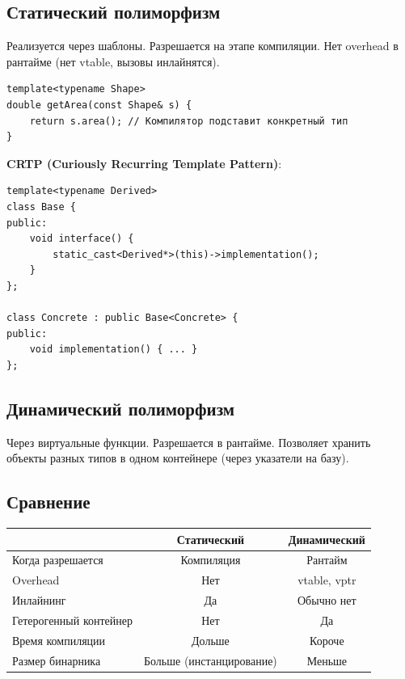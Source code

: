 \documentclass[12pt,a4paper]{article}
\begin{document}
\subsection{Статический полиморфизм}

Реализуется через шаблоны. Разрешается на этапе компиляции. Нет overhead в рантайме (нет vtable, вызовы инлайнятся).

\begin{lstlisting}
template<typename Shape>
double getArea(const Shape& s) {
    return s.area(); // Компилятор подставит конкретный тип
}
\end{lstlisting}

\textbf{CRTP (Curiously Recurring Template Pattern)}:
\begin{lstlisting}
template<typename Derived>
class Base {
public:
    void interface() {
        static_cast<Derived*>(this)->implementation();
    }
};

class Concrete : public Base<Concrete> {
public:
    void implementation() { ... }
};
\end{lstlisting}

\subsection{Динамический полиморфизм}

Через виртуальные функции. Разрешается в рантайме. Позволяет хранить объекты разных типов в одном контейнере (через указатели на базу).

\subsection{Сравнение}

\begin{center}
\begin{tabular}{|l|c|c|}
\hline
& \textbf{Статический} & \textbf{Динамический} \\
\hline
Когда разрешается & Компиляция & Рантайм \\
Overhead & Нет & vtable, vptr \\
Инлайнинг & Да & Обычно нет \\
Гетерогенный контейнер & Нет & Да \\
Время компиляции & Дольше & Короче \\
Размер бинарника & Больше (инстанцирование) & Меньше \\
\hline
\end{tabular}
\end{center}
\end{document}
